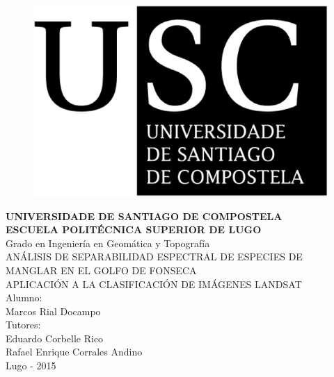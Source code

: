 




\begin{figure}[t]
\centering
\includegraphics[scale=0.2]{./Imagenes/USCbn.eps} %
\end{figure}

\begin{center}
\textbf{{\Huge UNIVERSIDADE DE SANTIAGO DE COMPOSTELA}\\[1cm]
{\LARGE ESCUELA POLITÉCNICA SUPERIOR DE LUGO}}\\[2cm]
{\Large Grado en Ingeniería en Geomática y Topografía}\\[3cm]
{\Large ANÁLISIS DE SEPARABILIDAD ESPECTRAL DE ESPECIES DE MANGLAR EN EL GOLFO DE FONSECA}\\
{\Large APLICACIÓN A LA CLASIFICACIÓN DE IMÁGENES LANDSAT}\\[2cm]
{\normalsize \vfill{Alumno:\\Marcos Rial Docampo\\Tutores:\\Eduardo Corbelle Rico\\Rafael Enrique Corrales Andino}}\\
{\footnotesize \vfill{Lugo - 2015%
}}
\end{center}